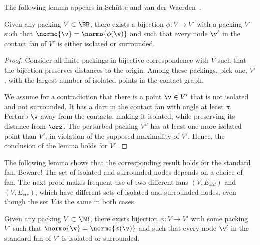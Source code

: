 The following lemma appears in Sch\"utte and van der
Waerden~\cite{vanderWaerden:1951}.

\begin{lemma}[]
\label{lemma:iso-surround}
Given any packing $V\subset \BB$,
there exists a bijection $\phi:V\to V'$ with a  packing $V'$ 
such that $\normo{\v} = \normo{\phi(\v)}$ and
such that every node $\v'$ in the contact fan of $V'$
is either isolated or surrounded.
\end{lemma}
%
%
%

\begin{proof} Consider all finite packings in bijective correspondence
  with $V$ such that the bijection preserves distances to
  the origin.  Among these packings, pick one, $V'$, with the largest
  number of isolated points in the contact graph.  

We assume for a contradiction that  there is a point
  $\v\in V'$ that is not isolated and not surrounded.  It  has a
  dart in the contact fan with angle at least $\pi$.  Perturb $\v$ away from the
  contacts, making it isolated, while preserving its distance from
  $\orz$.  The perturbed packing $V''$ has at least one more isolated point
  than $V'$, in violation of the supposed maximality of $V'$.
  Hence, the conclusion of the lemma holds for $V'$.
\end{proof}

The following lemma shows that the corresponding result holds for the
standard fan.  Beware!  The set of isolated and surrounded
nodes depends on a choice of fan.  The next proof makes frequent use
of two different fans $(V,E_{std})$ and $(V,E_{ctc})$, which have
different sets of isolated and surrounded nodes, even though the
set $V$ is the same in both cases.



\begin{lemma}[] %
\label{lemma:surrounded}  %
Given any packing $V\subset \BB$, there exists bijection $\phi:V\to
V'$ with some packing $V'$ such that $\normo{\v} = \normo{\phi(\v)}$
and such that every node $\v'$ in the standard fan of $V'$ is isolated
or surrounded.  %
\end{lemma}

